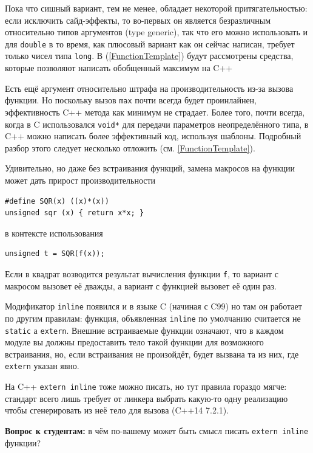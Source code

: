 \documentclass[a4paper,12pt,oneside]{book}
\begin{document}
Пока что сишный вариант, тем не менее, обладает некоторой притягательностью: если исключить сайд-эффекты, то во-первых он является безразличным относительно типов аргументов (type generic), так что его можно использовать и для \lstinline!double! в то время, как плюсовый вариант как он сейчас написан, требует только чисел типа \lstinline!long!. В (\ref{FunctionTemplate}) будут рассмотрены средства, которые позволяют написать обобщенный максимум на C++

Есть ещё аргумент относительно штрафа на производительность из-за вызова функции. Но поскольку вызов \lstinline!max! почти всегда будет проинлайнен, эффективность C++ метода как минимум не страдает. Более того, почти всегда, когда в C использовался \lstinline!void*! для передачи параметров неопределённого типа, в C++ можно написать более эффективный код, используя шаблоны. Подробный разбор этого следует несколько отложить (см. \ref{FunctionTemplate}).

Удивительно, но даже без встраивания функций, замена макросов на функции может дать прирост производительности

\begin{lstlisting}
#define SQR(x) ((x)*(x))
unsigned sqr (x) { return x*x; }
\end{lstlisting}

в контексте использования

\begin{lstlisting}
unsigned t = SQR(f(x));
\end{lstlisting}

Если в квадрат возводится результат вычисления функции \lstinline!f!, то вариант с макросом вызовет её дважды, а вариант с функцией вызовет её один раз.

Модификатор \lstinline!inline! появился и в языке C (начиная с C99) но там он работает по другим правилам: функция, объявленная \lstinline!inline! по умолчанию считается не \lstinline!static! а \lstinline!extern!. Внешние встраиваемые функции означают, что в каждом модуле вы должны предоставить тело такой функции для возможного встраивания, но, если встраивания не произойдёт, будет вызвана та из них, где \lstinline!extern! указан явно.

На C++ \lstinline!extern inline! тоже можно писать, но тут правила гораздо мягче: стандарт всего лишь требует от линкера выбрать какую-то одну реализацию чтобы сгенерировать из неё тело для вызова (C++14 7.2.1).

\textbf{Вопрос к студентам:} в чём по-вашему может быть смысл писать \lstinline!extern inline! функции?
\end{document}
